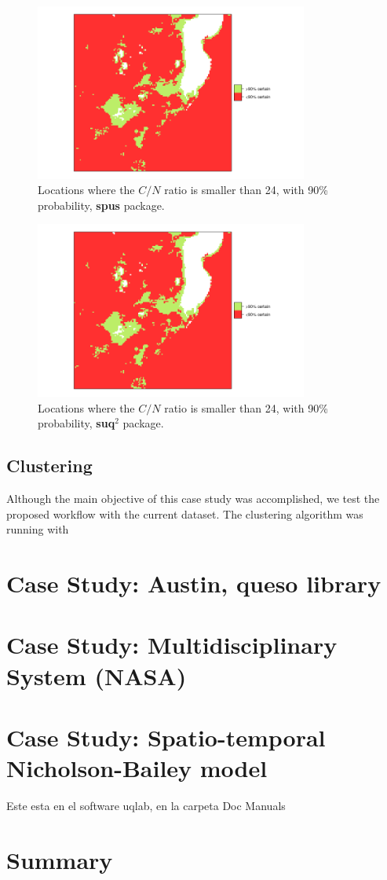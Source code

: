 \begin{figure}[H]
    \centering
    \includegraphics[width=0.8\textwidth]{img/use_cases/spus/respuesta_spus2.png}
    \caption{Locations where the $C/N$ ratio is smaller than 24, with 90\% probability, \textbf{spus} package.}
    \label{fig:resp_spus}
\end{figure}

\begin{figure}[H]
    \centering
    \includegraphics[width=0.8\textwidth]{img/use_cases/spus/respuesta_suq22.png}
    \caption{Locations where the $C/N$ ratio is smaller than 24, with 90\% probability, \textbf{suq$^2$} package.}
    \label{fig:resp_suq2}
\end{figure}

\subsection{Clustering}
Although the main objective of this case study was accomplished, we test the proposed workflow with the current dataset. The clustering algorithm was running with



\section{Case Study: Austin, queso library}\label{spatio_temporal}

\section{Case Study: Multidisciplinary System (NASA)}\label{NASA}

\section{Case Study: Spatio-temporal Nicholson-Bailey model}
Este esta en el software uqlab, en la carpeta Doc Manuals

\section{Summary}\label{sec:use_case_summary}
